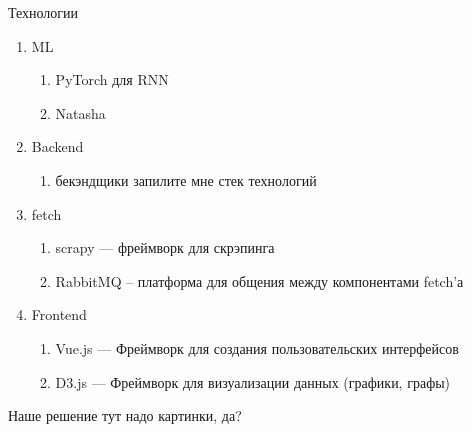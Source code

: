 \documentclass[10pt,pdf,hyperref={unicode}]{beamer}
\begin{document}
\begin{frame}{Технологии}
\begin{enumerate}
    \item ML
    \begin{enumerate}
        \item PyTorch для RNN
        \item Natasha
    \end{enumerate}
    \item Backend
        \begin{enumerate}
            \item бекэндщики запилите мне стек технологий
        \end{enumerate}
    \item fetch
        \begin{enumerate}
            \item scrapy --- фреймворк для скрэпинга
            \item RabbitMQ -- платформа для общения между компонентами fetch'а
        \end{enumerate}
    \item Frontend
        \begin{enumerate}
            \item Vue.js --- Фреймворк для создания пользовательских интерфейсов
            \item D3.js --- Фреймворк для визуализации данных (графики, графы)
        \end{enumerate}
\end{enumerate}
\end{frame}
\begin{frame}{Наше решение}
тут надо картинки, да?
    
\end{frame}
\end{document}

